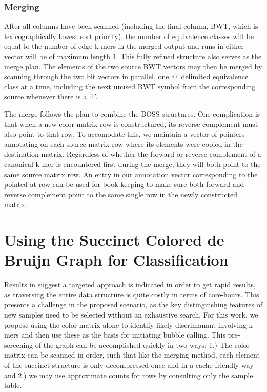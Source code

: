 \documentclass[doctor]{thesis}
\begin{document}
\subsection{Merging}
After all columns have been scanned (including the final column,  BWT, which is lexicographically lowest sort priority), the number of equivalence classes will be equal to the number of edge k-mers in the merged output and runs in either vector will be of maximum length 1.  This fully refined structure also serves as the merge plan.  The elements of the two source BWT vectors may then be merged by scanning through the two bit vectors in parallel, one `0' delimited equivalence class at a time, including the next unused BWT symbol from the corresponding source whenever there is a `1'.


The merge follows the plan to combine the BOSS structures.  One complication is that when a new color matrix row is constructured, its reverse complement must also point to that row.  To accomodate this, we maintain a vector of pointers annotating on each source matrix row where its elements were copied in the destination matrix.  Regardless of whether the forward or reverse complement of a canonical k-mer is encountered first during the merge, they will both point to the same source matrix row.  An entry in our annotation vector corresponding to the pointed at row can be used for book keeping to make sure both forward and reverse complement point to the same single row in the newly constructed matrix.
 



\chapter{Using the Succinct Colored de Bruijn Graph for Classification}
Results in \cite{VARI} suggest a targeted approach is indicated in order to get rapid results, as traversing the entire data structure is quite costly in terms of core-hours.  This presents a challenge in the proposed scenario, as the key distinguishing features of new samples need to be selected without an exhaustive search. For this work, we propose using the color matrix alone to identify likely discrimanant involving k-mers and then use these as the basis for initiating bubble calling.  This pre-screening of the graph can be accomplished quickly in two ways: 1.) The color matrix can be scanned in order, such that like the merging method, each element of the succinct structure is only decompressed once and in a cache friendly way and 2.) we may use approximate counts for rows by consulting only the sample table.
\end{document}
